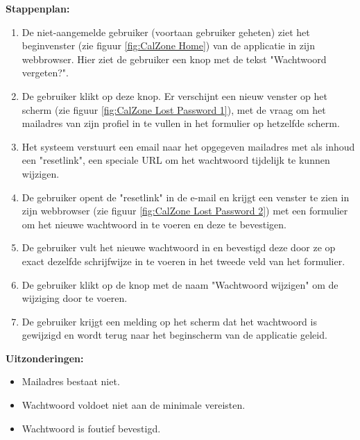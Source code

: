 \textbf{Stappenplan:}
\begin{enumerate}
\item De niet-aangemelde gebruiker (voortaan gebruiker geheten) ziet het beginvenster (zie figuur \ref{fig:CalZone Home}) van de applicatie in zijn webbrowser. Hier ziet de gebruiker een knop met de tekst "Wachtwoord vergeten?".
\item De gebruiker klikt op deze knop. Er verschijnt een nieuw venster op het scherm (zie figuur \ref{fig:CalZone Lost Password 1}), met de vraag om het mailadres van zijn profiel in te vullen in het formulier op hetzelfde scherm.
\item Het systeem verstuurt een email naar het opgegeven mailadres met als inhoud een "resetlink", een speciale URL om het wachtwoord tijdelijk te kunnen wijzigen.
\item De gebruiker opent de "resetlink" in de e-mail en krijgt een venster te zien in zijn webbrowser (zie figuur \ref{fig:CalZone Lost Password 2}) met een formulier om het nieuwe wachtwoord in te voeren en deze te bevestigen.
\item De gebruiker vult het nieuwe wachtwoord in en bevestigd deze door ze op exact dezelfde schrijfwijze in te voeren in het tweede veld van het formulier.
\item De gebruiker klikt op de knop met de naam "Wachtwoord wijzigen" om de wijziging door te voeren.
\item De gebruiker krijgt een melding op het scherm dat het wachtwoord is gewijzigd en wordt terug naar het beginscherm van de applicatie geleid.
\end{enumerate}

\textbf{Uitzonderingen:}
\begin{itemize}
\item Mailadres bestaat niet.
\item Wachtwoord voldoet niet aan de minimale vereisten.
\item Wachtwoord is foutief bevestigd.
\end{itemize}

